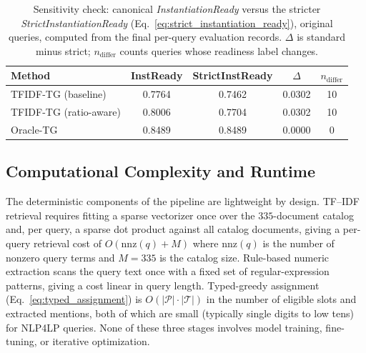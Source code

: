 \documentclass[3p]{elsarticle}
\begin{document}
\begin{table}[t]
\centering
\caption{Sensitivity check: canonical \textit{InstantiationReady} versus the stricter \textit{StrictInstantiationReady} (Eq.~\eqref{eq:strict_instantiation_ready}), original queries, computed from the final per-query evaluation records. $\Delta$ is standard minus strict; $n_{\text{differ}}$ counts queries whose readiness label changes.}
\label{tab:strict-instready}
\small
\begin{tabular}{lcccc}
  \toprule
  Method & InstReady & StrictInstReady & $\Delta$ & $n_{\text{differ}}$ \\
  \midrule
  TFIDF-TG (baseline) & 0.7764 & 0.7462 & 0.0302 & 10 \\
  TFIDF-TG (ratio-aware) & 0.8006 & 0.7704 & 0.0302 & 10 \\
  Oracle-TG & 0.8489 & 0.8489 & 0.0000 & 0 \\
  \bottomrule
\end{tabular}
\end{table}

\subsection{Computational Complexity and Runtime}
\label{subsec:exp_runtime}

The deterministic components of the pipeline are lightweight by design. TF--IDF retrieval requires fitting a sparse vectorizer once over the $335$-document catalog and, per query, a sparse dot product against all catalog documents, giving a per-query retrieval cost of $O(\mathrm{nnz}(q) + M)$ where $\mathrm{nnz}(q)$ is the number of nonzero query terms and $M=335$ is the catalog size. Rule-based numeric extraction scans the query text once with a fixed set of regular-expression patterns, giving a cost linear in query length. Typed-greedy assignment (Eq.~\eqref{eq:typed_assignment}) is $O(|\mathcal{P}| \cdot |\mathcal{T}|)$ in the number of eligible slots and extracted mentions, both of which are small (typically single digits to low tens) for NLP4LP queries. None of these three stages involves model training, fine-tuning, or iterative optimization.
\end{document}
